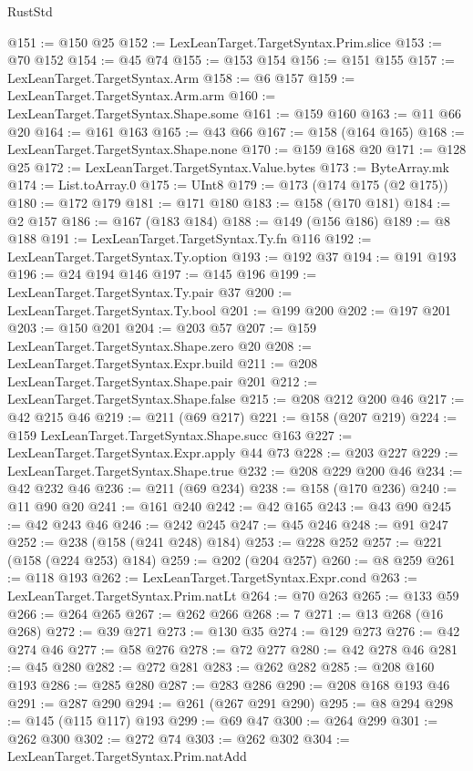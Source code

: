 \begin{lexlean}{RustStd}
\begin{coremodule}
@151 := @150 @25
@152 := LexLeanTarget.TargetSyntax.Prim.slice
@153 := @70 @152
@154 := @45 @74
@155 := @153 @154
@156 := @151 @155
@157 := LexLeanTarget.TargetSyntax.Arm
@158 := @6 @157
@159 := LexLeanTarget.TargetSyntax.Arm.arm
@160 := LexLeanTarget.TargetSyntax.Shape.some
@161 := @159 @160
@163 := @11 @66 @20
@164 := @161 @163
@165 := @43 @66
@167 := @158 (@164 @165)
@168 := LexLeanTarget.TargetSyntax.Shape.none
@170 := @159 @168 @20
@171 := @128 @25
@172 := LexLeanTarget.TargetSyntax.Value.bytes
@173 := ByteArray.mk
@174 := List.toArray.{0}
@175 := UInt8
@179 := @173 (@174 @175 (@2 @175))
@180 := @172 @179
@181 := @171 @180
@183 := @158 (@170 @181)
@184 := @2 @157
@186 := @167 (@183 @184)
@188 := @149 (@156 @186)
@189 := @8 @188
@191 := LexLeanTarget.TargetSyntax.Ty.fn @116
@192 := LexLeanTarget.TargetSyntax.Ty.option
@193 := @192 @37
@194 := @191 @193
@196 := @24 @194 @146
@197 := @145 @196
@199 := LexLeanTarget.TargetSyntax.Ty.pair @37
@200 := LexLeanTarget.TargetSyntax.Ty.bool
@201 := @199 @200
@202 := @197 @201
@203 := @150 @201
@204 := @203 @57
@207 := @159 LexLeanTarget.TargetSyntax.Shape.zero @20
@208 := LexLeanTarget.TargetSyntax.Expr.build
@211 := @208 LexLeanTarget.TargetSyntax.Shape.pair @201
@212 := LexLeanTarget.TargetSyntax.Shape.false
@215 := @208 @212 @200 @46
@217 := @42 @215 @46
@219 := @211 (@69 @217)
@221 := @158 (@207 @219)
@224 := @159 LexLeanTarget.TargetSyntax.Shape.succ @163
@227 := LexLeanTarget.TargetSyntax.Expr.apply @44 @73
@228 := @203 @227
@229 := LexLeanTarget.TargetSyntax.Shape.true
@232 := @208 @229 @200 @46
@234 := @42 @232 @46
@236 := @211 (@69 @234)
@238 := @158 (@170 @236)
@240 := @11 @90 @20
@241 := @161 @240
@242 := @42 @165
@243 := @43 @90
@245 := @42 @243 @46
@246 := @242 @245
@247 := @45 @246
@248 := @91 @247
@252 := @238 (@158 (@241 @248) @184)
@253 := @228 @252
@257 := @221 (@158 (@224 @253) @184)
@259 := @202 (@204 @257)
@260 := @8 @259
@261 := @118 @193
@262 := LexLeanTarget.TargetSyntax.Expr.cond
@263 := LexLeanTarget.TargetSyntax.Prim.natLt
@264 := @70 @263
@265 := @133 @59
@266 := @264 @265
@267 := @262 @266
@268 := 7
@271 := @13 @268 (@16 @268)
@272 := @39 @271
@273 := @130 @35
@274 := @129 @273
@276 := @42 @274 @46
@277 := @58 @276
@278 := @72 @277
@280 := @42 @278 @46
@281 := @45 @280
@282 := @272 @281
@283 := @262 @282
@285 := @208 @160 @193
@286 := @285 @280
@287 := @283 @286
@290 := @208 @168 @193 @46
@291 := @287 @290
@294 := @261 (@267 @291 @290)
@295 := @8 @294
@298 := @145 (@115 @117) @193
@299 := @69 @47
@300 := @264 @299
@301 := @262 @300
@302 := @272 @74
@303 := @262 @302
@304 := LexLeanTarget.TargetSyntax.Prim.natAdd

\end{coremodule}
\end{lexlean}
